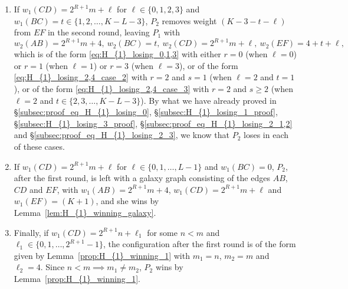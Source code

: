 \documentclass[11pt,reqno]{amsart}
\theoremstyle{definition}
\theoremstyle{definition}
\begin{document}
\begin{enumerate}
\begin{enumerate}
\item If $w_{1}(CD)=2^{R+1}m+\ell$ for $\ell \in \{0,1,2,3\}$ and $w_{1}(BC)=t\in\{1,2,\ldots,K-L-3\}$, $P_{2}$ removes weight $(K-3-t-\ell)$ from $EF$ in the second round, leaving $P_{1}$ with
\begin{equation}
w_{2}(AB)=2^{R+1}m+4,\ w_{2}(BC)=t,\ w_{2}(CD)=2^{R+1}m+\ell,\ w_{2}(EF)=4+t+\ell,\nonumber
\end{equation}
which is of the form \eqref{eq:H_{1}_losing_0,1,3} with either $r=0$ (when $\ell=0$) or $r=1$ (when $\ell=1$) or $r=3$ (when $\ell=3$), or of the form \eqref{eq:H_{1}_losing_2,4_case_2} with $r=2$ and $s=1$ (when $\ell=2$ and $t=1$), or of the form \eqref{eq:H_{1}_losing_2,4_case_3} with $r=2$ and $s\geqslant 2$ (when $\ell=2$ and $t\in \{2,3,\ldots,K-L-3\}$). By what we have already proved in \S\ref{subsec:proof_eq_H_{1}_losing_0}, \S\ref{subsec:H_{1}_losing_1_proof}, \S\ref{subsec:H_{1}_losing_3_proof}, \S\ref{subsec:proof_eq_H_{1}_losing_2_1,2} and \S\ref{subsec:proof_eq_H_{1}_losing_2_3}, we know that $P_{2}$ loses in each of these cases.

\item If $w_{1}(CD)=2^{R+1}m+\ell$ for $\ell \in \{0,1,\ldots,L-1\}$ and $w_{1}(BC)=0$, $P_{2}$, after the first round, is left with a galaxy graph consisting of the edges $AB$, $CD$ and $EF$, with $w_{1}(AB)=2^{R+1}m+4$, $w_{1}(CD)=2^{R+1}m+\ell$ and $w_{1}(EF)=(K+1)$, and she wins by Lemma~\ref{lem:H_{1}_winning_galaxy}.

\item Finally, if $w_{1}(CD)=2^{R+1}n+\ell_{1}$ for some $n<m$ and $\ell_{1}\in\{0,1,\ldots,2^{R+1}-1\}$, the configuration after the first round is of the form given by Lemma~\ref{prop:H_{1}_winning_1} with $m_{1}=n$, $m_{2}=m$ and $\ell_{2}=4$. Since $n<m \implies m_{1}\neq m_{2}$, $P_{2}$ wins by Lemma~\ref{prop:H_{1}_winning_1}.
\end{enumerate}


\end{enumerate}
\end{document}
